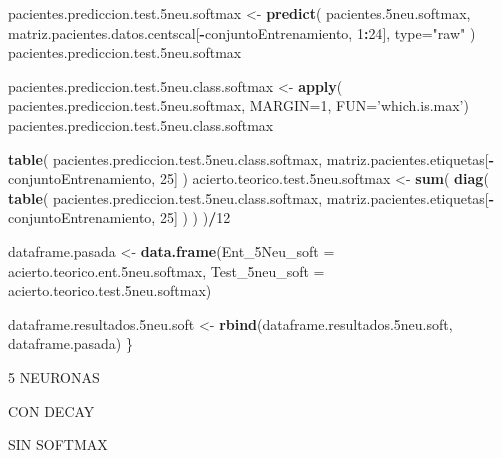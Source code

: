 \documentclass[]{article}
\newenvironment{Shaded}{\begin{snugshade}}{\end{snugshade}}
\newcommand{\KeywordTok}[1]{\textcolor[rgb]{0.13,0.29,0.53}{\textbf{#1}}}
\newcommand{\DataTypeTok}[1]{\textcolor[rgb]{0.13,0.29,0.53}{#1}}
\newcommand{\DecValTok}[1]{\textcolor[rgb]{0.00,0.00,0.81}{#1}}
\newcommand{\StringTok}[1]{\textcolor[rgb]{0.31,0.60,0.02}{#1}}
\newcommand{\OperatorTok}[1]{\textcolor[rgb]{0.81,0.36,0.00}{\textbf{#1}}}
\newcommand{\NormalTok}[1]{#1}
\begin{document}
\begin{Shaded}
\begin{Highlighting}[]
\NormalTok{  pacientes.prediccion.test.5neu.softmax <-}\StringTok{ }\KeywordTok{predict}\NormalTok{( pacientes.5neu.softmax, matriz.pacientes.datos.centscal[}\OperatorTok{-}\NormalTok{conjuntoEntrenamiento, }\DecValTok{1}\OperatorTok{:}\DecValTok{24}\NormalTok{], }\DataTypeTok{type=}\StringTok{"raw"}\NormalTok{ )}
\NormalTok{  pacientes.prediccion.test.5neu.softmax}
  
\NormalTok{  pacientes.prediccion.test.5neu.class.softmax <-}\StringTok{ }\KeywordTok{apply}\NormalTok{( pacientes.prediccion.test.5neu.softmax, }\DataTypeTok{MARGIN=}\DecValTok{1}\NormalTok{, }\DataTypeTok{FUN=}\StringTok{'which.is.max'}\NormalTok{)}
\NormalTok{  pacientes.prediccion.test.5neu.class.softmax}
  
  \KeywordTok{table}\NormalTok{( pacientes.prediccion.test.5neu.class.softmax, matriz.pacientes.etiquetas[}\OperatorTok{-}\NormalTok{conjuntoEntrenamiento, }\DecValTok{25}\NormalTok{] )}
\NormalTok{  acierto.teorico.test.5neu.softmax <-}\StringTok{ }\KeywordTok{sum}\NormalTok{( }\KeywordTok{diag}\NormalTok{( }\KeywordTok{table}\NormalTok{( pacientes.prediccion.test.5neu.class.softmax, matriz.pacientes.etiquetas[}\OperatorTok{-}\NormalTok{conjuntoEntrenamiento, }\DecValTok{25}\NormalTok{] ) ) )}\OperatorTok{/}\DecValTok{12}
  
  
\NormalTok{  dataframe.pasada <-}\StringTok{ }\KeywordTok{data.frame}\NormalTok{(}\DataTypeTok{Ent_5Neu_soft =}\NormalTok{ acierto.teorico.ent.5neu.softmax,}
                                 \DataTypeTok{Test_5neu_soft =}\NormalTok{ acierto.teorico.test.5neu.softmax)}
  
\NormalTok{  dataframe.resultados.5neu.soft <-}\StringTok{ }\KeywordTok{rbind}\NormalTok{(dataframe.resultados.5neu.soft, dataframe.pasada)}
\NormalTok{\}}
\end{Highlighting}
\end{Shaded}

5 NEURONAS

CON DECAY

SIN SOFTMAX
\end{document}
